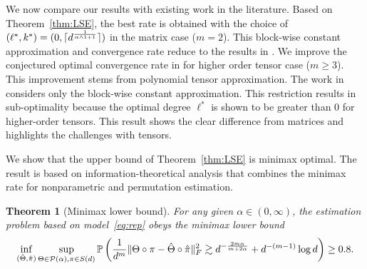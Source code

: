 \documentclass{article}
\newtheorem{thm}{Theorem}
\theoremstyle{definition}
\begin{document}
We now compare our results with existing work in the literature. Based on Theorem~\ref{thm:LSE}, the best rate is obtained with the choice of  $(\ell^*, k^*) = (0,\lceil d^{1\over\alpha\wedge1+1}\rceil)$ in the matrix case ($m =2$). This block-wise constant approximation and convergence rate reduce to the results in  \cite{gao2016optimal,klopp2017oracle}. We improve the conjectured optimal convergence rate in \cite{balasubramanian2021nonparametric} for higher order tensor case ($m\geq 3$). This improvement stems from polynomial tensor approximation. The work in
\cite{balasubramanian2021nonparametric} considers only the block-wise constant approximation.  This restriction results in sub-optimality because the optimal degree $\ell^*$ is shown to be greater than 0 for higher-order tensors.  This result shows the clear difference from matrices and highlights the challenges with  tensors. 

We show that the upper bound of Theorem~\ref{thm:LSE} is  minimax optimal.
The result is based on information-theoretical analysis that combines the minimax rate for nonparametric and permutation estimation.
\begin{thm}[Minimax lower bound]\label{thm:minimax}For any given $\alpha\in(0,\infty)$, the estimation problem based on model~\eqref{eq:rep} obeys the minimax lower bound 
\begin{equation}\label{eq:minimax}
\inf_{(\hat \Theta,\hat \pi)}\sup_{\Theta\in \mathcal{P}(\alpha), \pi\in S(d)} \mathbb{P}\left({1\over d^m}\lVert\Theta\circ \pi-\hat \Theta\circ \hat \pi\rVert_F^2 \gtrsim d^{-{2m\alpha\over m+2\alpha}}+d^{-(m-1)}\log d \right) \geq 0.8.
\end{equation}
\end{thm}



\end{document}

